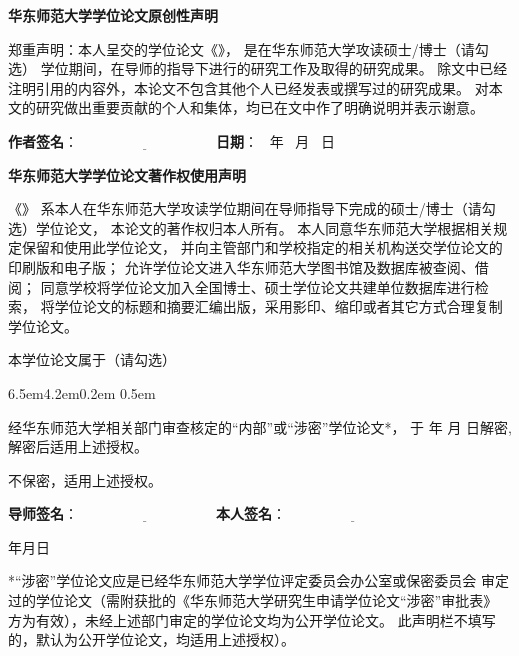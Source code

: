 
\thispagestyle{empty}
\vspace*{1em}

{
\linespread{1.4}
\centerline{ \bfseries 华东师范大学学位论文原创性声明}

\bigskip

郑重声明：本人呈交的学位论文《\Title》，
是在华东师范大学攻读硕士/博士（请勾选）
学位期间，在导师的指导下进行的研究工作及取得的研究成果。
除文中已经注明引用的内容外，本论文不包含其他个人已经发表或撰写过的研究成果。
对本文的研究做出重要贡献的个人和集体，均已在文中作了明确说明并表示谢意。

\vspace{1em}


{\bfseries 作者签名}：$\underline{\hspace{4cm}}$ \hfill
{\bfseries 日\quad 期}： \qquad\ 年 \quad\ 月 \quad\ 日 \qquad\mbox{}

\vspace{4em}

\centerline{\bfseries 华东师范大学学位论文著作权使用声明}
\bigskip


《\Title》
系本人在华东师范大学攻读学位期间在导师指导下完成的硕士/博士（请勾选）学位论文，
本论文的著作权归本人所有。
本人同意华东师范大学根据相关规定保留和使用此学位论文，
并向主管部门和学校指定的相关机构送交学位论文的印刷版和电子版；
允许学位论文进入华东师范大学图书馆及数据库被查阅、借阅；
同意学校将学位论文加入全国博士、硕士学位论文共建单位数据库进行检索，
将学位论文的标题和摘要汇编出版，采用影印、缩印或者其它方式合理复制学位论文。

本学位论文属于（请勾选）
\begin{list}{{\hfill\upshape (\qquad)\ . }}{%
     \leftmargin6.5em4.2em0.2em
     \itemsep0.5em}

\item 经华东师范大学相关部门审查核定的“内部”或“涉密”学位论文*，
  于 \qquad 年 \quad 月 \quad  日解密, 解密后适用上述授权。

\item 不保密，适用上述授权。
\end{list}

\vskip0.8cm


{\bfseries 导师签名}：$\underline{\hspace{4cm}}$ \hfill
{\bfseries 本人签名}：$\underline{\hspace{4cm}}$

\bigskip

{\mbox{}\hfill 年\qquad 月\qquad  日 }

\vfill

  \parbox[t]{0.946\textwidth}{
  *“涉密”学位论文应是已经华东师范大学学位评定委员会办公室或保密委员会
  审定过的学位论文（需附获批的《华东师范大学研究生申请学位论文“涉密”审批表》
  方为有效），未经上述部门审定的学位论文均为公开学位论文。
  此声明栏不填写的，默认为公开学位论文，均适用上述授权）。\\
  }
}

\clearpage{\pagestyle{empty}\cleardoublepage}
